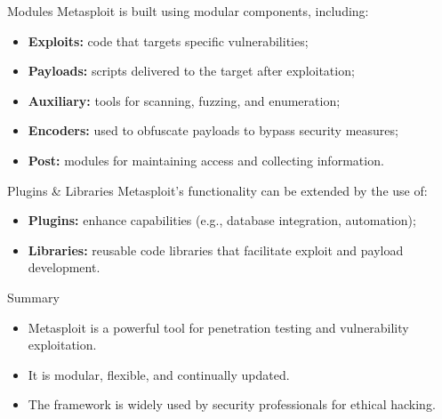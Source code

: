 \documentclass[]{beamer}
\begin{document}
\begin{frame}{Modules}
    Metasploit is built using modular components, including:
    \begin{itemize}
        \item \textbf{Exploits:} code that targets specific vulnerabilities;
        \item \textbf{Payloads:} scripts delivered to the target after exploitation;
        \item \textbf{Auxiliary:} tools for scanning, fuzzing, and enumeration;
        \item \textbf{Encoders:} used to obfuscate payloads to bypass security measures;
        \item \textbf{Post:} modules for maintaining access and collecting information.
    \end{itemize}
\end{frame}

\begin{frame}{Plugins \& Libraries}
    Metasploit’s functionality can be extended by the use of:
    \begin{itemize}
        \item \textbf{Plugins:} enhance capabilities (e.g., database integration, automation);
        \item \textbf{Libraries:} reusable code libraries that facilitate exploit and payload development.
    \end{itemize}
\end{frame}

\begin{frame}{Summary}
    \begin{itemize}
        \item Metasploit is a powerful tool for penetration testing and vulnerability exploitation.
        \item It is modular, flexible, and continually updated.
        \item The framework is widely used by security professionals for ethical hacking.
    \end{itemize}
\end{frame}
\end{document}
